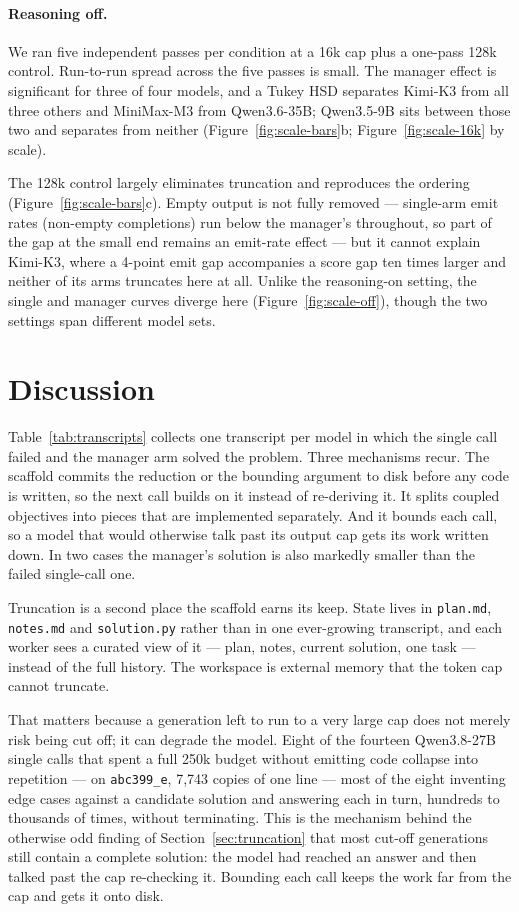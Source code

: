 \documentclass{article}
\begin{document}
\paragraph{Reasoning off.} We ran five independent
passes per condition at a 16k cap plus a one-pass 128k control. Run-to-run spread across the
five passes is small. The manager effect is significant for three
of four models, and a Tukey HSD separates Kimi-K3 from all three others and MiniMax-M3 from
Qwen3.6-35B; Qwen3.5-9B sits between those two and separates from neither
(Figure~\ref{fig:scale-bars}b; Figure~\ref{fig:scale-16k} by scale).

The 128k control largely eliminates truncation and reproduces the ordering
(Figure~\ref{fig:scale-bars}c). Empty output is not fully removed --- single-arm emit rates
(non-empty completions) run below the manager's throughout, so part of the gap at the small
end remains an emit-rate effect --- but it cannot explain Kimi-K3, where a 4-point emit gap
accompanies a score gap ten times larger and neither of its arms truncates here at all. Unlike
the reasoning-on setting, the single and manager curves diverge here
(Figure~\ref{fig:scale-off}), though the two settings span different model sets.

\section{Discussion}
\label{sec:discussion}

Table~\ref{tab:transcripts} collects one transcript per model in which the single call failed
and the manager arm solved the problem. Three mechanisms recur. The scaffold commits the
reduction or the bounding argument to disk before any code is written, so the next call builds
on it instead of re-deriving it. It splits coupled objectives into pieces that are implemented
separately. And it bounds each call, so a model that would otherwise talk past its output cap
gets its work written down. In two cases the manager's solution is also markedly smaller than
the failed single-call one.

Truncation is a second place the scaffold earns its keep. State lives in \texttt{plan.md},
\texttt{notes.md} and \texttt{solution.py} rather than in one ever-growing transcript, and
each worker sees a curated view of it --- plan, notes, current solution, one task --- instead
of the full history. The workspace is external memory that the token cap cannot truncate.

That matters because a generation left to run to a very large cap does not merely risk being
cut off; it can degrade the model. Eight of the fourteen Qwen3.8-27B single calls that spent a
full 250k budget without emitting code collapse into repetition --- on \texttt{abc399\_e},
7{,}743 copies of one line --- most of the eight inventing edge cases against a candidate
solution and answering each in turn, hundreds to thousands of times, without terminating. This
is the mechanism behind the otherwise odd finding of Section~\ref{sec:truncation} that most
cut-off generations still contain a complete solution: the model had reached an answer and
then talked past the cap re-checking it. Bounding each call keeps the work far from the cap and
gets it onto disk.
\end{document}
